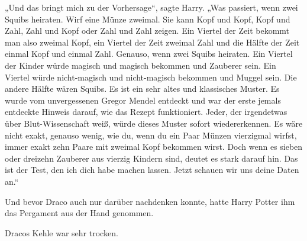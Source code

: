 „Und das bringt mich zu der Vorhersage“, sagte Harry.
„Was passiert, wenn zwei Squibs heiraten. Wirf eine Münze zweimal. Sie kann Kopf und Kopf, Kopf und Zahl, Zahl und Kopf oder Zahl und Zahl zeigen. Ein Viertel der Zeit bekommt man also zweimal Kopf, ein Viertel der Zeit zweimal Zahl und die Hälfte der Zeit einmal Kopf und einmal Zahl. Genauso, wenn zwei Squibs heiraten. Ein Viertel der Kinder würde magisch und magisch bekommen und Zauberer sein. Ein Viertel würde nicht-magisch und nicht-magisch bekommen und Muggel sein. Die andere Hälfte wären Squibs. Es ist ein sehr altes und klassisches Muster. Es wurde vom unvergessenen Gregor Mendel entdeckt und war der erste jemals entdeckte Hinweis darauf, wie das Rezept funktioniert. Jeder, der irgendetwas über Blut-Wissenschaft weiß, würde dieses Muster sofort wiedererkennen. Es wäre nicht exakt, genauso wenig, wie du, wenn du ein Paar Münzen vierzigmal wirfst, immer exakt zehn Paare mit zweimal Kopf bekommen wirst. Doch wenn es sieben oder dreizehn Zauberer aus vierzig Kindern sind, deutet es stark darauf hin. Das ist der Test, den ich dich habe machen lassen. Jetzt schauen wir uns deine Daten an.“

Und bevor Draco auch nur darüber nachdenken konnte, hatte Harry Potter ihm das Pergament aus der Hand genommen.

Dracos Kehle war sehr trocken.

